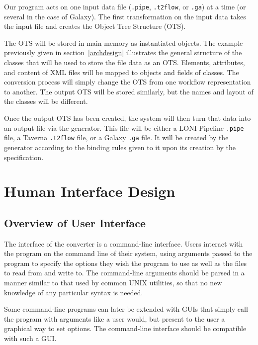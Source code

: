 \documentclass[12pt]{article}
\begin{document}
Our program acts on one input data file (\texttt{.pipe}, \texttt{.t2flow}, or \texttt{.ga}) at a time (or several in the case of Galaxy). The first transformation on the input data takes the input file and creates the Object Tree Structure (OTS).

The OTS will be stored in main memory as instantiated objects. The example previously given in section~\ref{archdesign} illustrates the general structure of the classes that will be used to store the file data as an OTS. Elements, attributes, and content of XML files will be mapped to objects and fields of classes. The conversion process will simply change the OTS from one workflow representation to another. The output OTS will be stored similarly, but the names and layout of the classes will be different.

Once the output OTS has been created, the system will then turn that data into an output file via the generator. This file will be either a LONI Pipeline \texttt{.pipe} file, a Taverna \texttt{.t2flow} file, or a Galaxy \texttt{.ga} file. It will be created by the generator according to the binding rules given to it upon its creation by the specification. 

\section{Human Interface Design}

\subsection{Overview of User Interface}

The interface of the converter is a command-line interface. Users interact with the program on the command line of their system, using arguments passed to the program to specify the options they wish the program to use as well as the files to read from and write to. The command-line arguments should be parsed in a manner similar to that used by common UNIX utilities, so that no new knowledge of any particular syntax is needed.

Some command-line programs can later be extended with GUIs that simply call the program with arguments like a user would, but present to the user a graphical way to set options. The command-line interface should be compatible with such a GUI.
\end{document}
